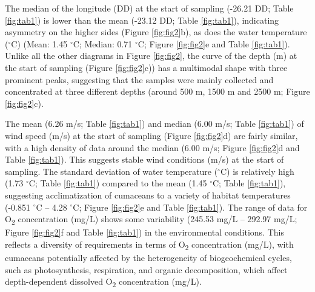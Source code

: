 The median of the longitude (DD) at the start of sampling (-26.21 DD; Table \ref{fig:tab1}) is lower than the mean (-23.12 DD; Table \ref{fig:tab1}), indicating asymmetry on the higher sides (Figure \ref{fig:fig2}b), as does the water temperature ($^\circ$C) (Mean: 1.45 $^\circ$C; Median: 0.71 $^\circ$C; Figure \ref{fig:fig2}e and Table \ref{fig:tab1}). Unlike all the other diagrams in Figure \ref{fig:fig2}, the curve of the depth (m) at the start of sampling (Figure \ref{fig:fig2}c)) has a multimodal shape with three prominent peaks, suggesting that the samples were mainly collected and concentrated at three different depths (around 500 m, 1500 m and 2500 m; Figure \ref{fig:fig2}c).

The mean (6.26 m/s; Table \ref{fig:tab1}) and median (6.00 m/s; Table \ref{fig:tab1}) of wind speed (m/s) at the start of sampling (Figure \ref{fig:fig2}d) are fairly similar, with a high density of data around the median (6.00 m/s; Figure \ref{fig:fig2}d and Table \ref{fig:tab1}). This suggests stable wind conditions (m/s) at the start of sampling. The standard deviation of water temperature ($^\circ$C) is relatively high (1.73 $^\circ$C; Table \ref{fig:tab1}) compared to the mean (1.45 $^\circ$C; Table \ref{fig:tab1}), suggesting acclimatization of cumaceans to a variety of habitat temperatures (-0.851 $^\circ$C – 4.28 $^\circ$C; Figure \ref{fig:fig2}e and Table \ref{fig:tab1}). The range of data for O\textsubscript{2} concentration (mg/L) shows some variability (245.53 mg/L – 292.97 mg/L; Figure \ref{fig:fig2}f and Table \ref{fig:tab1}) in the environmental conditions. This reflects a diversity of requirements in terms of O\textsubscript{2} concentration (mg/L), with cumaceans potentially affected by the heterogeneity of biogeochemical cycles, such as photosynthesis, respiration, and organic decomposition, which affect depth-dependent dissolved O\textsubscript{2} concentration (mg/L).

